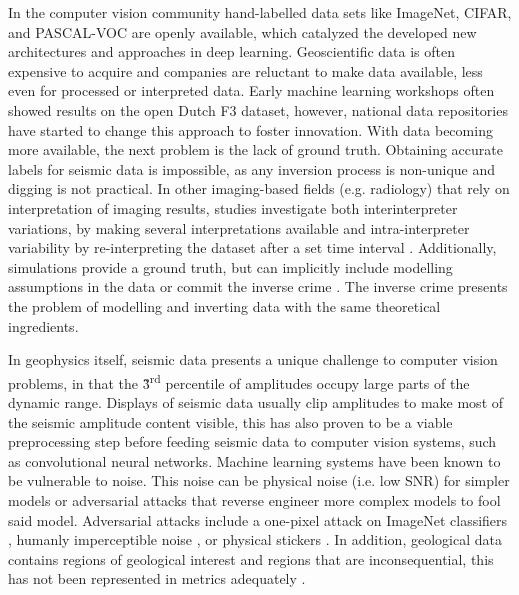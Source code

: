 

In the computer vision community hand-labelled data sets like ImageNet, CIFAR, and PASCAL-VOC are openly available, which catalyzed the developed new architectures and approaches in deep learning. Geoscientific data is often expensive to acquire and companies are reluctant to make data available, less even for processed or interpreted data. Early machine learning workshops often showed results on the open Dutch F3 dataset, however, national data repositories have started to change this approach to foster innovation. With data becoming more available, the next problem is the lack of ground truth. Obtaining accurate labels for seismic data is impossible, as any inversion process is non-unique and digging is not practical. In other imaging-based fields (e.g. radiology) that rely on interpretation of imaging results, studies investigate both interinterpreter variations, by making several interpretations available and intra-interpreter variability by re-interpreting the dataset after a set time interval \citep{macerlean2013, alikhassi2018comparison,al2010inter}. Additionally, simulations provide a ground truth, but can implicitly include modelling assumptions in the data or commit the inverse crime \citep{wirgin2004inverse}. The inverse crime presents the problem of modelling and inverting data with the same theoretical ingredients.


In geophysics itself, seismic data presents a unique challenge to computer vision problems, in that the \~3\textsuperscript{rd} percentile of amplitudes occupy large parts of the dynamic range. Displays of seismic data usually clip amplitudes to make most of the seismic amplitude content visible, this has also proven to be a viable preprocessing step before feeding seismic data to computer vision systems, such as convolutional neural networks. Machine learning systems have been known to be vulnerable to noise. This noise can be physical noise (i.e. low SNR) for simpler models or adversarial attacks that reverse engineer more complex models to fool said model. Adversarial attacks include a one-pixel attack on ImageNet classifiers \citep{su2019one}, humanly imperceptible noise \citep{goodfellow2014explaining}, or physical stickers \citep{brown2017adversarial}. In addition, geological data contains regions of geological interest and regions that are inconsequential, this has not been represented in metrics adequately \citep{purves2019towards}.

